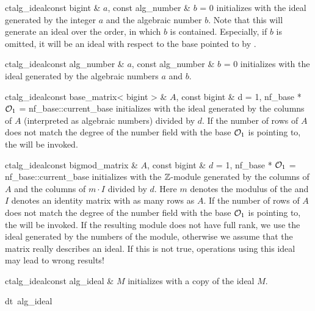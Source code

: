 \begin{fcode}{ct}{alg_ideal}{const bigint & $a$, const alg_number & $b$ = 0}
  initializes with the ideal generated by the integer $a$ and the algebraic number $b$.  Note
  that this will generate an ideal over the order, in which $b$ is contained.  Especially, if
  $b$ is omitted, it will be an ideal with respect to the base pointed to by
  .
\end{fcode}

\begin{fcode}{ct}{alg_ideal}{const alg_number & $a$, const alg_number & $b$ = 0}
  initializes with the ideal generated by the algebraic numbers $a$ and $b$.
\end{fcode}

\begin{fcode}{ct}{alg_ideal}{const base_matrix< bigint > & $A$, const bigint & d = 1,
    nf_base * $\mathcal{O}_1$ = nf_base::current_base}%
  initializes with the ideal generated by the columns of $A$ (interpreted as algebraic numbers)
  divided by $d$.  If the number of rows of $A$ does not match the degree of the number field
  with the base $\mathcal{O}_1$ is pointing to, the \LEH will be invoked.
\end{fcode}

\begin{fcode}{ct}{alg_ideal}{const bigmod_matrix & $A$, const bigint & $d$ = 1,
    nf_base * $\mathcal{O}_1$ = nf_base::current_base}%
  initializes with the $\mathbb{Z}$-module generated by the columns of $A$ and the columns of $m\cdot
  I$ divided by $d$.  Here $m$ denotes the modulus of the  and $I$ denotes
  an identity matrix with as many rows as $A$.  If the number of rows of $A$ does not match the
  degree of the number field with the base $\mathcal{O}_1$ is pointing to, the \LEH will be invoked.  If
  the resulting module does not have full rank, we use the ideal generated by the numbers of the
  module, otherwise we assume that the matrix really describes an ideal.  If this is not true,
  operations using this ideal may lead to wrong results!
\end{fcode}

\begin{fcode}{ct}{alg_ideal}{const alg_ideal & $M$}
  initializes with a copy of the ideal $M$.
\end{fcode}

\begin{fcode}{dt}{{~alg_ideal}}{}
\end{fcode}


